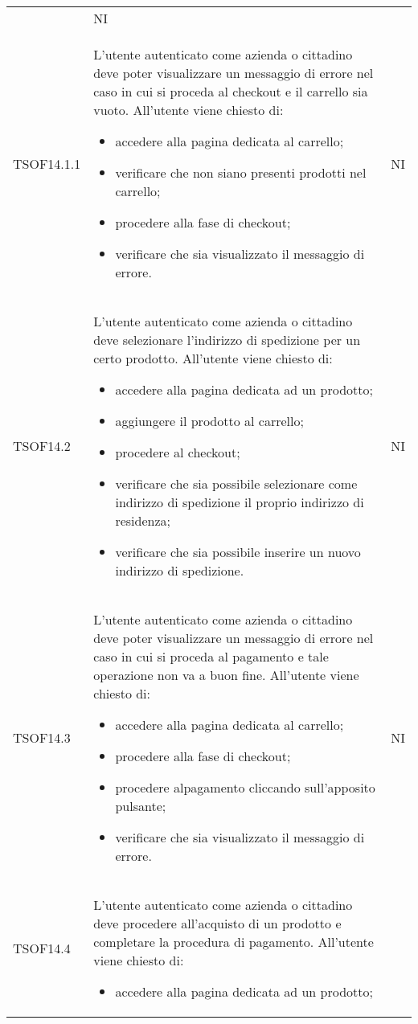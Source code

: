 \begin{table}[H]
\begin{longtable}{ >{\centering}p{} >{\centering}p{}
			>{\centering}p{}}
\begin{itemize}
		\end{itemize}	&	NI	\tabularnewline
		TSOF14.1.1	&	L'utente autenticato come azienda o cittadino deve poter visualizzare un
		messaggio di errore nel caso in cui si proceda al checkout e il carrello sia
		vuoto. All'utente viene chiesto di:
		\begin{itemize}
			\item accedere alla pagina dedicata al carrello;
			\item verificare che non siano presenti prodotti nel carrello;
			\item procedere alla fase di checkout;
			\item verificare che sia visualizzato il messaggio di errore.
		\end{itemize}	&	NI	\tabularnewline
		TSOF14.2	&	L'utente autenticato come azienda o cittadino deve selezionare l'indirizzo di
		spedizione per un certo prodotto. All'utente viene chiesto di:
		\begin{itemize}
			\item accedere alla pagina dedicata ad un prodotto;
			\item aggiungere il prodotto al carrello;
			\item procedere al checkout;
			\item verificare che sia possibile selezionare come indirizzo di
			spedizione il proprio indirizzo di residenza;
			\item verificare che sia possibile inserire un nuovo indirizzo di
			spedizione.
		\end{itemize}	&	NI	\tabularnewline
		TSOF14.3	&	L'utente autenticato come azienda o cittadino deve poter visualizzare un
		messaggio di errore nel caso in cui si proceda al pagamento e tale operazione non va a buon fine. All'utente viene chiesto di:
		\begin{itemize}
			\item accedere alla pagina dedicata al carrello;
			\item procedere alla fase di checkout;
			\item procedere alpagamento cliccando sull'apposito pulsante;
			\item verificare che sia visualizzato il messaggio di errore.
		\end{itemize}	&	NI	\tabularnewline
		TSOF14.4	&	L'utente autenticato come azienda o cittadino deve procedere all'acquisto di un prodotto e completare la procedura di pagamento. All'utente viene chiesto di:
		\begin{itemize}
			\item accedere alla pagina dedicata ad un prodotto;

\end{itemize}
\end{longtable}
\end{table}
